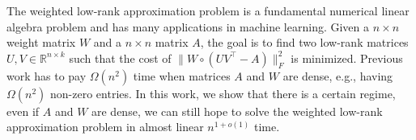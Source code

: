 The weighted low-rank approximation problem is a fundamental numerical linear algebra problem and has many applications in machine learning. Given a $n \times n$ weight matrix $W$ and a $n \times n$ matrix $A$, the goal is to find two low-rank matrices $U, V \in \mathbb{R}^{n \times k}$ such that the cost of $\| W \circ (U V^\top - A) \|_F^2$ is minimized. Previous work has to pay $\Omega(n^2)$ time when matrices $A$ and $W$ are dense, e.g., having $\Omega(n^2)$ non-zero entries. In this work, we show that there is a certain regime, even if $A$ and $W$ are dense,  we can still hope to solve the weighted low-rank approximation problem in almost linear $n^{1+o(1)}$ time.